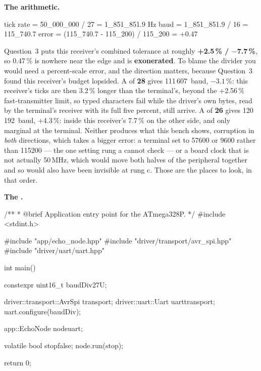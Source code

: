 \textbf{The arithmetic.}

\begin{console}
tick rate = 50_000_000 / 27      = 1_851_851.9 Hz
baud      = 1_851_851.9 / 16     = 115_740.7
error     = (115_740.7 - 115_200) / 115_200 = +0.47%
\end{console}

\noindent Question~3 puts this receiver's combined tolerance at roughly \textbf{+2.5\,\% /
$-$7.7\,\%}, so 0.47\,\% is nowhere near the edge and  is \textbf{exonerated}.
To blame the divider you would need a percent-scale error, and the direction matters, because
Question~3 found this receiver's budget lopsided. A  of \textbf{28} gives
111\,607~baud, $-3.1$\,\%: this receiver's ticks are then 3.2\,\% longer than the terminal's, beyond
the +2.56\,\% fast-transmitter limit, so typed characters fail while the driver's own bytes, read by
the terminal's receiver with its full five percent, still arrive. A  of \textbf{26}
gives 120\,192~baud, +4.3\,\%: inside this receiver's 7.7\,\% on the other side, and only marginal at
the terminal. Neither produces what this bench shows, corruption in \emph{both} directions, which
takes a bigger error: a terminal set to 57600 or 9600 rather than 115200 --- the one setting rung a
cannot check --- or a board clock that is not actually 50\,MHz, which would move both halves of the
peripheral together and so would also have been invisible at rung c. Those are the places to look,
in that order. 

\textbf{The .}

\begin{cppcode}
/**
 * @brief Application entry point for the ATmega328P.
 */
#include <stdint.h>

#include "app/echo_node.hpp"
#include "driver/transport/avr_spi.hpp"
#include "driver/uart/uart.hpp"

int main()
{
    constexpr uint16_t baudDiv{27U};

    driver::transport::AvrSpi transport{};
    driver::uart::Uart        uart{transport};
    uart.configure(baudDiv);

    app::EchoNode node{uart};

    volatile bool stop{false};
    node.run(stop);

    return 0;
}
\end{cppcode}

